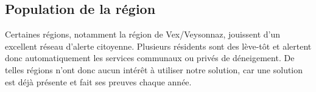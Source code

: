 \subsection{Population de la région}
Certaines régions, notamment la région de Vex/Veysonnaz, jouissent d'un
excellent réseau d'alerte citoyenne. Plusieurs résidents sont des lève-tôt et
alertent donc automatiquement les services communaux ou privés de déneigement.
De telles régions n'ont donc aucun intérêt à utiliser notre solution, car
une solution est déjà présente et fait ses preuves chaque année.
